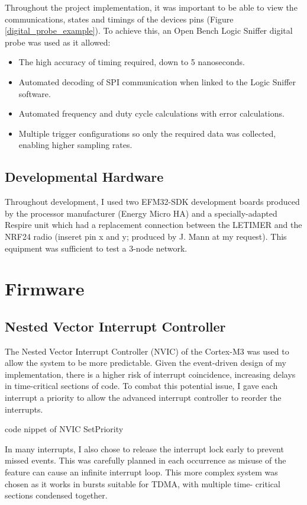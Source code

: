 Throughout the project implementation, it was important to be able to view the communications,
states and timings of the devices pins (Figure \ref{digital_probe_example}). To achieve this, an Open Bench Logic Sniffer digital probe was
used as it allowed:
\begin{itemize}
  \item The high accuracy of timing required, down to 5 nanoseconds.
  \item Automated decoding of SPI communication when linked to the Logic Sniffer software.
  \item Automated frequency and duty cycle calculations with error calculations.
  \item Multiple trigger configurations so only the required data was collected, enabling higher
        sampling rates.
\end{itemize}

\subsection{Developmental Hardware}
Throughout development, I used two EFM32-SDK development boards produced by the processor
manufacturer (Energy Micro HA) and a specially-adapted Respire unit which had a replacement
connection between the LETIMER and the NRF24 radio (inseret pin x and y; produced by J. Mann at
my request). This equipment was sufficient to test a 3-node network.

\section{Firmware}

\subsection{Nested Vector Interrupt Controller}
The Nested Vector Interrupt Controller (NVIC) of the Cortex-M3 was used to allow the system to be
more predictable. Given the event-driven design of my implementation, there is a higher risk of
interrupt coincidence, increasing delays in time-critical sections of code. To combat this potential
issue, I gave each interrupt a priority to allow the advanced interrupt controller to reorder the
interrupts.

{code nippet of NVIC SetPriority}

In many interrupts, I also chose to release the interrupt lock early to prevent missed events. This was
carefully planned in each occurrence as misuse of the feature can cause an infinite interrupt loop.
This more complex system was chosen as it works in bursts suitable for TDMA, with multiple time-
critical sections condensed together.


